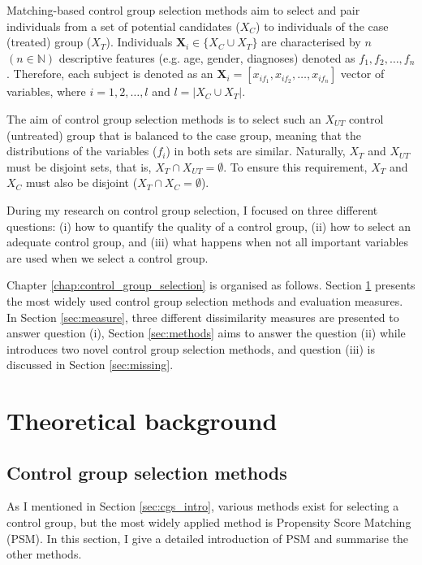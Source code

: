 Matching-based control group selection methods aim to select and pair individuals from a set of potential candidates ($X_C$) to individuals of the case (treated) group ($X_T$). Individuals $\textbf{X}_i \in \{X_C \cup X_T\}$ are characterised by $n$ $(n \in \mathbb{N})$ descriptive features (e.g. age, gender, diagnoses) denoted as $f_1, f_2, \dots, f_n$. Therefore, each subject is denoted as an $\textbf{X}_i =[x_{if_1}, x_{if_2}, \dots, x_{if_n}]$ vector of variables, where $i=1, 2, \dots,l$ and $l=|X_C \cup X_T|$.

The aim of control group selection methods is to select such an $X_{UT}$ control (untreated) group that is balanced to the case group, meaning that the distributions of the variables ($f_i$) in both sets are similar. Naturally, $X_T$ and $X_{UT}$ must be disjoint sets, that is, $X_T \cap X_{UT} = \emptyset$. To ensure this requirement, $X_T$ and $X_C$ must also be disjoint ($X_T \cap X_C = \emptyset$).

During my research on control group selection, I focused on three different questions: (i) how to quantify the quality of a control group, (ii) how to select an adequate control group, and (iii) what happens when not all important variables are used when we select a control group.

Chapter \ref{chap:control_group_selection} is organised as follows. Section \ref{sec:theo_selection} presents the most widely used control group selection methods and evaluation measures. In Section \ref{sec:measure}, three different dissimilarity measures are presented to answer question (i), Section \ref{sec:methods} aims to answer the question (ii) while introduces two novel control group selection methods, and question (iii) is discussed in Section \ref{sec:missing}.

\section{Theoretical background}
\label{sec:theo_selection}

\subsection{Control group selection methods}
\label{sec:cgsm}

As I mentioned in Section \ref{sec:cgs_intro}, various methods exist for selecting a control group, but the most widely applied method is Propensity Score Matching (PSM). In this section, I give a detailed introduction of PSM and summarise the other methods. 

